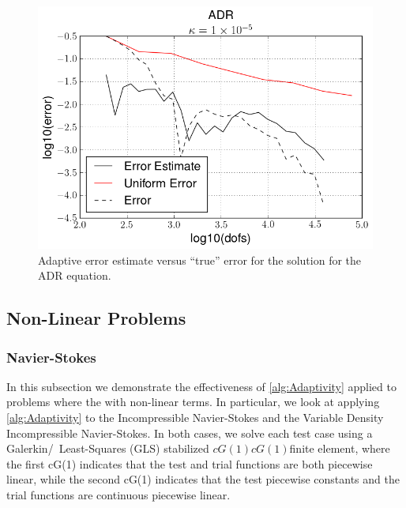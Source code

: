 \begin{test}[Convection Dominated, $\kappa = 1\times10^{-5}$]
    \begin{figure}[h]
        \centering
        \includegraphics[scale=0.5]{Figures/AdaptiveADRkappa1E-5.png}
        \caption{Adaptive error estimate versus ``true'' error for the solution
            for the ADR equation.}
        \label{fig:ADR_err}
    \end{figure}

\end{test}

\subsection{Non-Linear Problems}

\subsubsection{Navier-Stokes}

In this subsection we demonstrate the effectiveness of \autoref{alg:Adaptivity}
applied to problems where the with non-linear terms. In particular, we look at
applying \autoref{alg:Adaptivity} to the Incompressible Navier-Stokes and the
Variable Density Incompressible Navier-Stokes. In both cases, we solve each test
case using a Galerkin\slash~Least-Squares (GLS) stabilized $cG(1)cG(1)$finite
element, where the first cG(1) indicates that the test and trial functions are
both piecewise linear, while the second cG(1) indicates that the test piecewise
constants and the trial functions are continuous piecewise linear.

